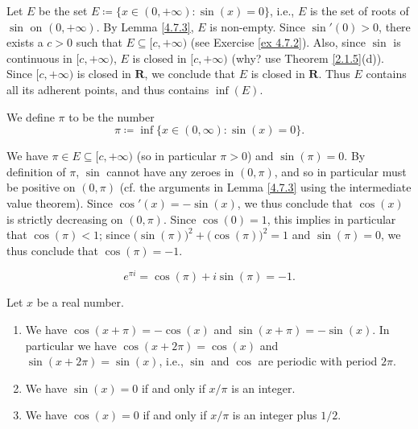 \begin{note}
    Let \(E\) be the set \(E \coloneqq \{x \in (0, +\infty) : \sin(x) = 0\}\), i.e., \(E\) is the set of roots of \(\sin\) on \((0, +\infty)\).
    By Lemma \ref{4.7.3}, \(E\) is non-empty.
    Since \(\sin'(0) > 0\), there exists a \(c > 0\) such that \(E \subseteq [c, +\infty)\) (see Exercise \ref{ex 4.7.2}).
    Also, since \(\sin\) is continuous in \([c, +\infty)\), \(E\) is closed in \([c, +\infty)\) (why? use Theorem \ref{2.1.5}(d)).
    Since \([c, +\infty)\) is closed in \(\mathbf{R}\), we conclude that \(E\) is closed in \(\mathbf{R}\).
    Thus \(E\) contains all its adherent points, and thus contains \(\inf(E)\).
\end{note}

\begin{definition}\label{4.7.4}
    We define \(\pi\) to be the number
    \[
        \pi \coloneqq \inf\{x \in (0, \infty) : \sin(x) = 0\}.
    \]
\end{definition}

\begin{additional corollary}\label{ac 4.7.2}
We have \(\pi \in E \subseteq [c, +\infty)\) (so in particular \(\pi > 0\)) and \(\sin(\pi) = 0\).
By definition of \(\pi\), \(\sin\) cannot have any zeroes in \((0, \pi)\), and so in particular must be positive on \((0, \pi)\)
(cf. the arguments in Lemma \ref{4.7.3} using the intermediate value theorem).
Since \(\cos'(x) = -\sin(x)\), we thus conclude that \(\cos(x)\) is strictly decreasing on \((0, \pi)\).
Since \(\cos(0) = 1\), this implies in particular that \(\cos(\pi) < 1\);
since \(\big(\sin(\pi)\big)^2 + \big(\cos(\pi)\big)^2 = 1\) and \(\sin(\pi) = 0\), we thus conclude that \(\cos(\pi) = -1\).
\end{additional corollary}

\begin{additional corollary}\label{ac 4.7.3}
\[
    e^{\pi i} = \cos(\pi) + i \sin(\pi) = -1.
\]
\end{additional corollary}

\begin{theorem}\label{4.7.5}
    Let \(x\) be a real number.
    \begin{enumerate}
        \item We have \(\cos(x + \pi) = -\cos(x)\) and \(\sin(x + \pi) = -\sin(x)\).
              In particular we have \(\cos(x + 2\pi) = \cos(x)\) and \(\sin(x + 2\pi) = \sin(x)\), i.e., \(\sin\) and \(\cos\) are periodic with period \(2\pi\).
        \item We have \(\sin(x) = 0\) if and only if \(x / \pi\) is an integer.
        \item We have \(\cos(x) = 0\) if and only if \(x / \pi\) is an integer plus \(1 / 2\).
    \end{enumerate}
\end{theorem}

